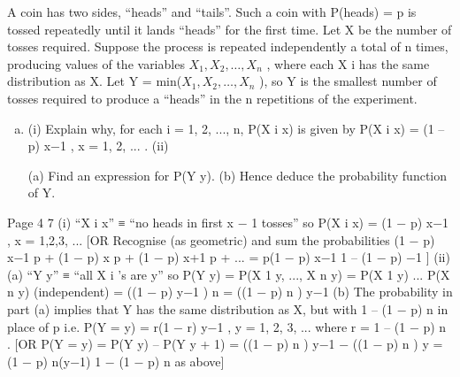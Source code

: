 \documentclass[a4paper,12pt]{article}
\begin{document}
A coin has two sides, “heads” and “tails”. Such a coin with P(heads) = p is tossed repeatedly until it lands “heads” for the first time. Let X be the number of tosses required.
Suppose the process is repeated independently a total of n times, producing values of
the variables $X_1 , X_2 , \ldots , X_n$ , where each X i has the same distribution as X.
Let Y = min($X_1 , X_2 , \ldots , X_n$ ), so Y is the smallest number of tosses required to produce
a “heads” in the n repetitions of the experiment.
\begin{enumerate}[(a)]
\item (i)
Explain why, for each i = 1, 2, ..., n, P(X i \geq x) is given by
P(X i \geq x) = (1 – p) x−1 , x = 1, 2, ... .
(ii)

(a) Find an expression for P(Y \geq y).
(b) Hence deduce the probability function of Y.

\end{enumerate}

Page 4%
7
(i)
“X i \geq x” ≡ “no heads in first x − 1 tosses” so P(X i \geq x) = (1 − p) x−1 , x = 1,2,3, ...
[OR Recognise (as geometric) and sum the probabilities
(1 − p) x−1 p + (1 − p) x p + (1 − p) x+1 p + ... = p(1 − p) x−1 {1 – (1 − p)} −1 ]
(ii)
(a)
“Y \geq y” ≡ “all X i ’s are \geq y”
so P(Y \geq y) = P(X 1 \geq y, ..., X n \geq y) = P(X 1 \geq y) ... P(X n \geq y)
(independent)
= ((1 − p) y−1 ) n = ((1 − p) n ) y−1
(b)
The probability in part (a) implies that Y has the same distribution as X,
but with 1 – (1 − p) n in place of p
i.e. P(Y = y) = r(1 − r) y−1 , y = 1, 2, 3, ... where r = 1 – (1 − p) n .
[OR P(Y = y) = P(Y \geq y) – P(Y \geq y + 1) = ((1 − p) n ) y−1 − ((1 − p) n ) y
= (1 − p) n(y−1) {1 − (1 − p) n } as above]

\end{document}
